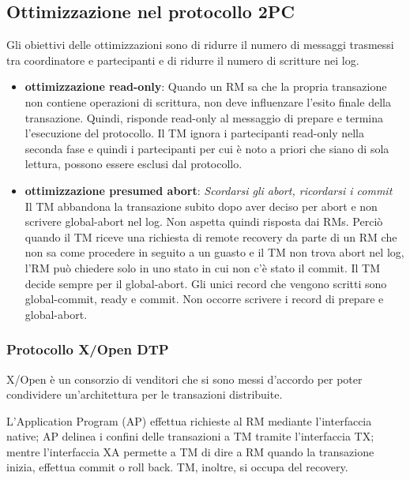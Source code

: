 \subsection{Ottimizzazione nel protocollo 2PC}
Gli obiettivi delle ottimizzazioni sono di ridurre il numero di messaggi trasmessi tra coordinatore e partecipanti e di ridurre il numero di scritture nei log.
\begin{itemize}
    \item \textbf{ottimizzazione read-only}:  Quando un RM sa che la propria transazione non contiene operazioni di scrittura, non deve influenzare l’esito finale della transazione.  Quindi, risponde read-only al messaggio di prepare e termina l’esecuzione del protocollo. Il TM ignora i partecipanti read-only nella seconda fase e quindi i partecipanti per cui è noto a priori che siano di sola lettura, possono essere esclusi dal protocollo.
    \item \textbf{ottimizzazione presumed abort}: \textit{Scordarsi gli abort, ricordarsi i commit}\\
    Il TM abbandona la transazione subito dopo aver deciso per abort e non scrivere global-abort nel log. Non aspetta quindi risposta dai RMs. Perciò quando il TM riceve una richiesta di remote recovery da parte di un RM che non sa come procedere in seguito a un guasto e il TM non trova abort nel log, l’RM può chiedere solo in uno stato in cui non c’è stato il commit. Il TM decide sempre per il global-abort.
    Gli unici record che vengono scritti sono global-commit, ready e commit. Non occorre scrivere i record di prepare e global-abort.
\end{itemize}

\subsubsection{Protocollo X/Open DTP}

X/Open è un consorzio di venditori che si sono messi d’accordo per poter condividere un’architettura per le transazioni distribuite.

L’Application Program (AP) effettua richieste al RM mediante l’interfaccia native; AP delinea i confini delle transazioni a TM tramite l’interfaccia TX; mentre l’interfaccia XA permette a TM di dire a RM quando la transazione inizia, effettua commit o roll back. TM, inoltre, si occupa del recovery.